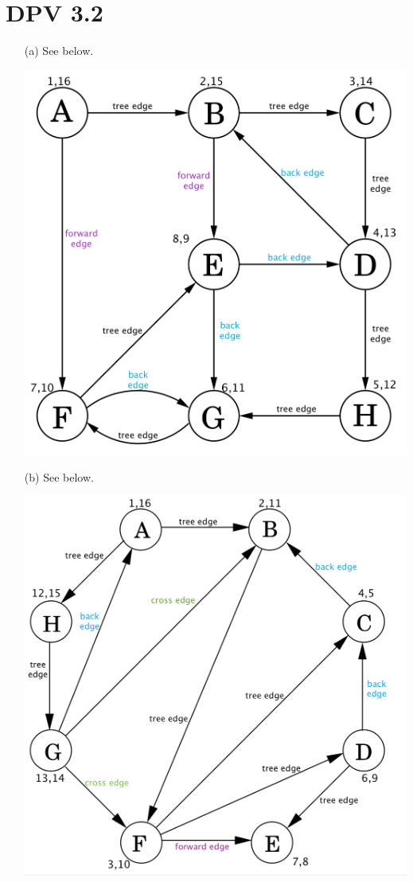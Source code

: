 \documentclass[twoside]{homework}
\begin{document}
\section{DPV 3.2}
\begin{enumerate}
	\item [(a)] See below.

		\includegraphics[width=.5\textwidth]{5a.png}
	\item [(b)] See below.

		\includegraphics[width=.5\textwidth]{5b.png}
\end{enumerate}
\end{document}
